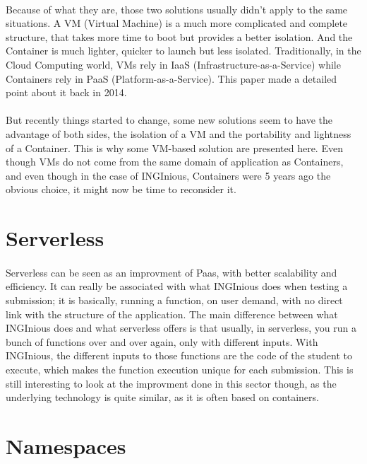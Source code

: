 \paragraph{}Because of what they are, those two solutions usually didn't apply to the same situations.  A VM (Virtual Machine) is a much more complicated and complete structure, that takes more time to boot but provides a better isolation.  And the Container is much lighter, quicker to launch but less isolated.  Traditionally, in the Cloud Computing world, VMs rely in IaaS (Infrastructure-as-a-Service) while Containers rely in PaaS (Platform-as-a-Service).  This paper \cite{dua2014virtualization} made a detailed point about it back in 2014.

\paragraph{}But recently things started to change, some new solutions seem to have the advantage of both sides, the isolation of a VM and the portability and lightness of a Container.  This is why some VM-based solution are presented here.  Even though VMs do not come from the same domain of application as Containers, and even though in the case of INGInious, Containers were 5 years ago the obvious choice, it might now be time to reconsider it.

\section{Serverless}
\paragraph{}Serverless can be seen as an improvment of Paas, with better scalability and efficiency.  It can really be associated with what INGInious does when testing a submission; it is basically, running a function, on user demand, with no direct link with the structure of the application.  The main difference between what INGInious does and what serverless offers is that usually, in serverless, you run a bunch of functions over and over again, only with different inputs.  With INGInious, the different inputs to those functions are the code of the student to execute, which makes the function execution unique for each submission.  This is still interesting to look at the improvment done in this sector though, as the underlying technology is quite similar, as it is often based on containers.

\section{Namespaces}
